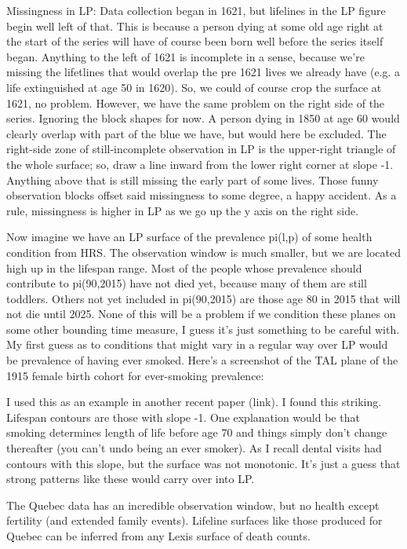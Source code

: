 \begin{small}
Missingness in LP:
Data collection began in 1621, but lifelines in the LP figure begin well left of that. This is because a person dying at some old age right at the start of the series will have of course been born well before the series itself began. Anything to the left of 1621 is incomplete in a sense, because we're missing the lifetlines that would overlap the pre 1621 lives we already have (e.g. a life extinguished at age 50 in 1620). So, we could of course crop the surface at 1621, no problem. However, we have the same problem on the right side of the series. Ignoring the block shapes for now.  A person dying in 1850 at age 60 would clearly overlap with part of the blue we have, but would here be excluded. The right-side zone of still-incomplete observation in LP is the upper-right triangle of the whole surface; so, draw a line inward from the lower right corner at slope -1. Anything above that is still missing the early part of some lives. Those funny observation blocks offset said missingness to some degree, a happy accident. As a rule, missingness is higher in LP as we go up the y axis on the right side.

Now imagine we have an LP surface of the prevalence pi(l,p) of some health condition from HRS. The observation window is much smaller, but we are located high up in the lifespan range. Most of the people whose prevalence should contribute to  pi(90,2015) have not died yet, because many of them are still toddlers. Others not yet included in  pi(90,2015) are those age 80 in 2015 that will not die until 2025. None of this will be a problem if we condition these planes on some other bounding time measure, I guess it's just something to be careful with. My first guess as to conditions that might vary in a regular way over LP would be prevalence of having ever smoked. Here's a screenshot of the TAL plane of the 1915 female birth cohort for ever-smoking prevalence:

I used this as an example in another recent paper (link). I found this striking. Lifespan contours are those with slope -1. One explanation would be that smoking determines length of life before age 70 and things simply don't change thereafter (you can't undo being an ever smoker). As I recall dental visits had contours with this slope, but the surface was not monotonic. It's just a guess that strong patterns like these would carry over into LP.

The Quebec data has an incredible observation window, but no health except fertility (and extended family events). Lifeline surfaces like those produced for Quebec can be inferred from any Lexis surface of death counts.
\end{small}

